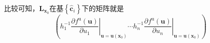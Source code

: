 \documentclass[../main.tex]{subfiles}
\begin{document}
比较可知，$\mathbf{L}_{\mathbf{x}_0}$在基$\left\{\mathbf{\hat{c}}_i\right\}$下的矩阵就是
\[\left(h_1^{-1}\left.\frac{\partial f^\mathrm{u}\left(\mathbf{u}\right)}{\partial u_1}\right|_{\mathbf{u}=\mathbf{u}\left(\mathbf{x}_0\right)}\cdots h_n^{-1}\left.\frac{\partial f^\mathrm{u}\left(\mathbf{u}\right)}{\partial u_n}\right|_{\mathbf{u}=\mathbf{u}\left(\mathbf{x}_0\right)}\right)\]
\end{document}
